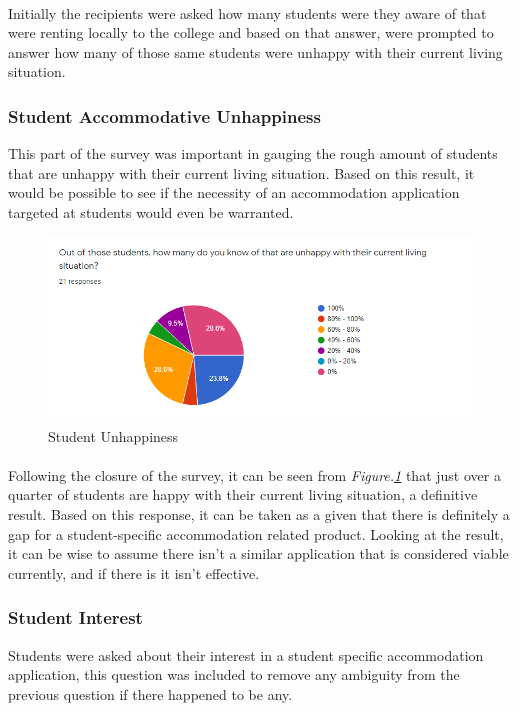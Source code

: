\paragraph{}
Initially the recipients were asked how many students were they aware of that were renting locally to the college and based on that answer, were prompted to answer how many of those same students were unhappy with their current living situation.

\subsubsection{Student Accommodative Unhappiness}
This part of the survey was important in gauging the rough amount of students that are unhappy with their current living situation. Based on this result, it would be possible to see if the necessity of an accommodation application targeted at students would even be warranted.

\begin{figure}[H]
	\caption{Student Unhappiness}
	\label{image:surveyHappy}
	\centering
	\includegraphics[width=1\textwidth]{images/survey_happy.png}
\end{figure}	

\paragraph{}
Following the closure of the survey, it can be seen from \textit{Figure.\ref{image:surveyHappy}} that just over a quarter of students are happy with their current living situation, a definitive result. Based on this response, it can be taken as a given that there is definitely a gap for a student-specific accommodation related product. Looking at the result, it can be wise to assume there isn't a similar application that is considered viable currently, and if there is it isn't effective.

\subsubsection{Student Interest}
Students were asked about their interest in a student specific accommodation application, this question was included to remove any ambiguity from the previous question if there happened to be any. 

